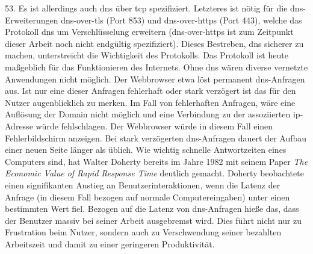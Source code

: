 \documentclass[titlepage]{report}
\begin{document}
53\cite[Siehe Section 4.2.1]{RFC1035}. Es ist allerdings auch \gls{dns}
über \gls{tcp} spezifiziert\cite[Siehe Section 4.2.2]{RFC1035}.
Letzteres ist nötig für die \gls{dns}\hyp{}Erweiterungen
\gls{dns}\hyp{}over\hyp{}\gls{tls} (Port 853) und
\gls{dns}\hyp{}over\hyp{}\gls{https} (Port 443), welche das Protokoll \gls{dns} um
Verschlüsselung erweitern\cite{RFC7858}
(\gls{dns}\hyp{}over\hyp{}\gls{https} ist zum Zeitpunkt dieser Arbeit
noch nicht endgültig spezifiziert). Dieses Bestreben, \gls{dns} sicherer
zu machen, unterstreicht die Wichtigkeit des Protokolls. Das Protokoll
ist heute maßgeblich für das Funktionieren  des Internets. Ohne
\gls{dns} wären diverse vernetzte Anwendungen nicht möglich. Der
Webbrowser etwa löst permanent \gls{dns}\hyp{}Anfragen aus. Ist nur
eine dieser Anfragen fehlerhaft oder stark verzögert ist das für den
Nutzer augenblicklich zu merken. Im Fall von fehlerhaften Anfragen, wäre
eine Auflösung der Domain nicht möglich und eine Verbindung zu der
assoziierten \gls{ip}\hyp{}Adresse würde fehlschlagen. Der Webbrowser
würde in diesem Fall einen Fehlerbildschirm anzeigen.
Bei stark verzögerten
\gls{dns}\hyp{}Anfragen dauert der Aufbau einer neuen Seite 
länger als üblich. Wie wichtig schnelle Antwortzeiten eines Computers
sind, hat Walter Doherty bereits im Jahre 1982 mit seinem Paper \emph{The
Economic Value of Rapid Response Time} deutlich gemacht. Doherty
beobachtete einen signifikanten Anstieg an Benutzerinteraktionen, wenn
die Latenz der Anfrage (in diesem Fall bezogen auf normale
Computereingaben) unter einen bestimmten Wert fiel\cite{DOHERTY}.
Bezogen auf die Latenz von \gls{dns}\hyp{}Anfragen hieße das, dass der
Benutzer massiv bei seiner Arbeit ausgebremst wird. Dies führt nicht nur
zu Frustration beim Nutzer, sondern auch zu Verschwendung seiner
bezahlten Arbeitszeit und damit zu einer geringeren Produktivität.
\end{document}
